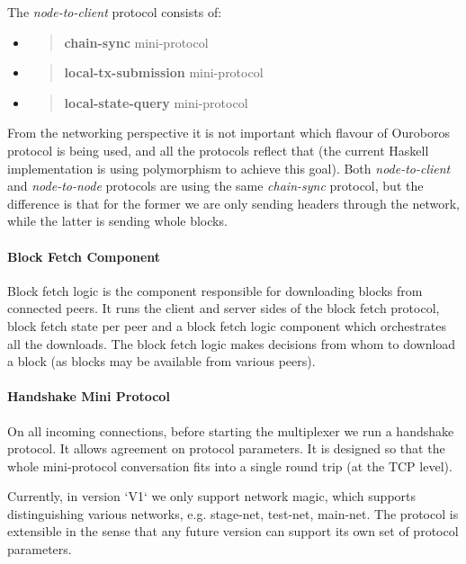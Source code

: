 \documentclass[11pt,a4paper]{article}
\begin{document}
The \emph{node-to-client} protocol consists of:

\begin{itemize}
\item
  \begin{quote}
  \textbf{chain-sync} mini-protocol
  \end{quote}
\item
  \begin{quote}
  \textbf{local-tx-submission} mini-protocol
  \end{quote}
\item
  \begin{quote}
  \textbf{local-state-query} mini-protocol
  \end{quote}
\end{itemize}

From the networking perspective it is not important which flavour of
Ouroboros protocol is being used, and all the protocols reflect that
(the current Haskell implementation is using polymorphism to achieve
this goal). Both \emph{node-to-client} and \emph{node-to-node} protocols
are using the same \emph{chain-sync} protocol, but the difference is
that for the former we are only sending headers through the network,
while the latter is sending whole blocks.

\paragraph{Block Fetch Component}

Block fetch logic is the component responsible for downloading blocks
from connected peers. It runs the client and server sides of the block
fetch protocol, block fetch state per peer and a block fetch logic
component which orchestrates all the downloads. The block fetch logic
makes decisions from whom to download a block (as blocks may be
available from various peers).

\paragraph{Handshake Mini Protocol}

On all incoming connections, before starting the multiplexer we run a
handshake protocol. It allows agreement on protocol parameters. It is
designed so that the whole mini-protocol conversation fits into a single
round trip (at the TCP level).

Currently, in version `V1` we only support network magic, which supports
distinguishing various networks, e.g. stage-net, test-net, main-net. The
protocol is extensible in the sense that any future version can support
its own set of protocol parameters.
\end{document}
